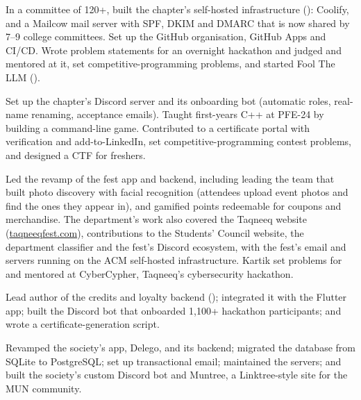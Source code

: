  In a committee of 120+, built the chapter's self-hosted
infrastructure (): Coolify, and a Mailcow mail server with SPF, DKIM and DMARC that
is now shared by 7--9 college committees. Set up the GitHub organisation, GitHub Apps and CI/CD.
Wrote problem statements for an overnight hackathon and judged and mentored at it, set
competitive-programming problems, and started Fool The LLM ().

 Set up the chapter's Discord server and its
onboarding bot (automatic roles, real-name renaming, acceptance emails). Taught first-years C++ at
PFE-24 by building a command-line game. Contributed to a certificate portal with
verification and add-to-LinkedIn, set competitive-programming contest problems, and designed a CTF
for freshers.

 Led the revamp of the fest app and backend,
including leading the team that built photo discovery with facial recognition (attendees upload
event photos and find the ones they appear in), and gamified points redeemable for coupons and
merchandise. The department's work also covered the Taqneeq website
(\href{https://taqneeqfest.com}{taqneeqfest.com}), contributions to the Students' Council website,
the department classifier and the fest's Discord ecosystem, with the fest's email and servers running on the ACM self-hosted
infrastructure. Kartik set problems for and mentored at CyberCypher, Taqneeq's cybersecurity
hackathon.

 Lead author of the credits and loyalty backend
(); integrated it with the Flutter app; built the Discord bot that onboarded
1,100+ hackathon participants; and wrote a certificate-generation script.


 Revamped the society's app, Delego, and its backend; migrated
the database from SQLite to PostgreSQL; set up transactional email; maintained the servers; and
built the society's custom Discord bot and Muntree, a Linktree-style site for the MUN community.

